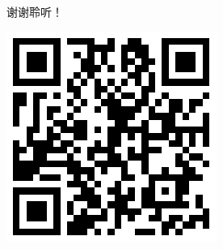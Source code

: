 \documentclass[11pt]{beamer}
\begin{document}
\begin{frame}
\begin{minipage}[t]{0.5\linewidth}
	\begin{center}
		\begin{figure}
			\Huge 谢谢聆听！
		\end{figure}
	\end{center}
\end{minipage}%
\begin{minipage}[t]{0.4\linewidth}
		\begin{figure}
		\centering
		\includegraphics[width=0.7\linewidth]{figures/blockchain101qrcode}
	\end{figure}
\end{minipage}%
\end{frame}
\end{document}
